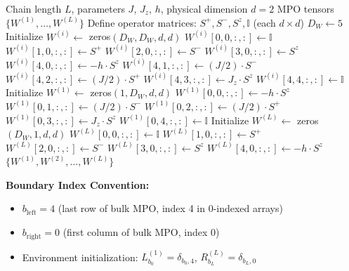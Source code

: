 \documentclass[aps,prb,onecolumn,scriptaddress]{revtex4-2}
\newcommand{\Id}{\mathbb{I}}
\begin{document}
	\begin{algorithm}[H]
		\caption{ConstructHeisenbergMPO}
		\begin{algorithmic}[1]
			\Require Chain length $L$, parameters $J$, $J_z$, $h$, physical dimension $d=2$
			\Ensure MPO tensors $\{W^{(1)}, \ldots, W^{(L)}\}$
			\State Define operator matrices: $S^+, S^-, S^z, \Id$ (each $d \times d$)
			\State $D_W \gets 5$ 
			\State {}
			\State Initialize $W^{(i)} \gets$ zeros$(D_W, D_W, d, d)$ 
			\State $W^{(i)}[0, 0, :, :] \gets \Id$ 
			\State $W^{(i)}[1, 0, :, :] \gets S^+$ 
			\State $W^{(i)}[2, 0, :, :] \gets S^-$ 
			\State $W^{(i)}[3, 0, :, :] \gets S^z$ 
			\State $W^{(i)}[4, 0, :, :] \gets -h \cdot S^z$ 
			\State $W^{(i)}[4, 1, :, :] \gets (J/2) \cdot S^-$ 
			\State $W^{(i)}[4, 2, :, :] \gets (J/2) \cdot S^+$ 
			\State $W^{(i)}[4, 3, :, :] \gets J_z \cdot S^z$ 
			\State $W^{(i)}[4, 4, :, :] \gets \Id$ 
			\State {}
			\EndFor
			\State {}
			\State Initialize $W^{(1)} \gets$ zeros$(1, D_W, d, d)$ 
			\State $W^{(1)}[0, 0, :, :] \gets -h \cdot S^z$ 
			\State $W^{(1)}[0, 1, :, :] \gets (J/2) \cdot S^-$
			\State $W^{(1)}[0, 2, :, :] \gets (J/2) \cdot S^+$
			\State $W^{(1)}[0, 3, :, :] \gets J_z \cdot S^z$
			\State $W^{(1)}[0, 4, :, :] \gets \Id$
			\State {}
			\State {}
			\State Initialize $W^{(L)} \gets$ zeros$(D_W, 1, d, d)$ 
			\State $W^{(L)}[0, 0, :, :] \gets \Id$
			\State $W^{(L)}[1, 0, :, :] \gets S^+$
			\State $W^{(L)}[2, 0, :, :] \gets S^-$
			\State $W^{(L)}[3, 0, :, :] \gets S^z$
			\State $W^{(L)}[4, 0, :, :] \gets -h \cdot S^z$ 
			\State {}
			\State \Return $\{W^{(1)}, W^{(2)}, \ldots, W^{(L)}\}$
		\end{algorithmic}
	\end{algorithm}
	
	\textbf{Boundary Index Convention:}
	\begin{itemize}
		\item $b_{\text{left}} = 4$ (last row of bulk MPO, index 4 in 0-indexed arrays)
		\item $b_{\text{right}} = 0$ (first column of bulk MPO, index 0)
		\item Environment initialization: $L^{(1)}_{b_0} = \delta_{b_0, 4}$, $R^{(L)}_{b_L} = \delta_{b_L, 0}$
	\end{itemize}
	
\end{document}
